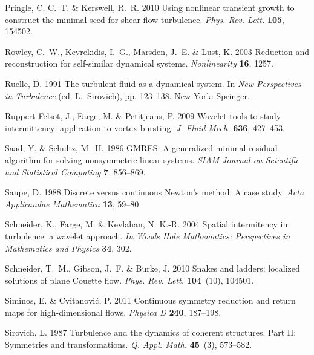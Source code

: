 \documentclass{jfm}
\begin{document}
\begin{thebibliography}{73}
{\sc Pringle, C. C.~T. \& Kerswell, R.~R.} 2010 Using nonlinear transient
  growth to construct the minimal seed for shear flow turbulence. {\em Phys.
  Rev. Lett.\/} {\bf 105}, 154502.

{\sc Rowley, C.~W., Kevrekidis, I.~G., Marsden, J.~E. \& Lust, K.} 2003
  Reduction and reconstruction for self-similar dynamical systems. {\em
  Nonlinearity\/} {\bf 16}, 1257.

{\sc Ruelle, D.} 1991 The turbulent fluid as a dynamical system. In {\em New
  Perspectives in Turbulence\/} (ed. L.~Sirovich), pp. 123--138. New York:
  Springer.

{\sc Ruppert-Felsot, J., Farge, M. \& Petitjeans, P.} 2009 Wavelet tools to
  study intermittency: application to vortex bursting. {\em J. Fluid Mech.\/}
  {\bf 636}, 427--453.

{\sc Saad, Y. \& Schultz, M.~H.} 1986 {GMRES}: A generalized minimal residual
  algorithm for solving nonsymmetric linear systems. {\em SIAM Journal on
  Scientific and Statistical Computing\/} {\bf 7}, 856--869.

{\sc Saupe, D.} 1988 Discrete versus continuous {N}ewton's method: A case
  study. {\em Acta Applicandae Mathematica\/} {\bf 13}, 59--80.

{\sc Schneider, K., Farge, M. \& Kevlahan, N. K.-R.} 2004 Spatial intermitency
  in turbulence: a wavelet approach. {\em In Woods Hole Mathematics:
  Perspectives in Mathematics and Physics\/} {\bf 34}, 302.

{\sc Schneider, T.~M., Gibson, J.~F. \& Burke, J.} 2010 Snakes and ladders:
  localized solutions of plane {C}ouette flow. {\em Phys. Rev. Lett.\/} {\bf
  104}~(10), 104501.

{\sc Siminos, E. \& Cvitanovi{\'c}, P.} 2011 Continuous symmetry reduction and
  return maps for high-dimensional flows. {\em Physica D\/} {\bf 240},
  187--198.

{\sc Sirovich, L.} 1987 Turbulence and the dynamics of coherent structures.
  {Part II}: {Symmetries} and transformations. {\em Q. Appl. Math.\/} {\bf
  45}~(3), 573--582.


\end{thebibliography}
\end{document}
